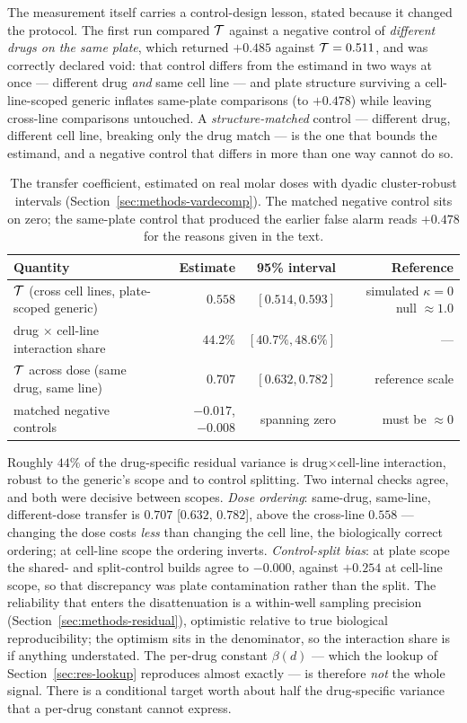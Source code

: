 The measurement itself carries a control-design lesson, stated because it changed the protocol.
The first run compared $\mathcal{T}$ against a negative control of \emph{different drugs on the same
plate}, which returned $+0.485$ against $\mathcal{T} = 0.511$, and was correctly declared void: that
control differs from the estimand in two ways at once --- different drug \emph{and} same cell line
--- and plate structure surviving a cell-line-scoped generic inflates same-plate comparisons (to
$+0.478$) while leaving cross-line comparisons untouched. A \emph{structure-matched} control ---
different drug, different cell line, breaking only the drug match --- is the one that bounds the
estimand, and a negative control that differs in more than one way cannot do so.

\begin{table}[h]
\centering
\begin{tabular}{lrrr}
\toprule
Quantity & Estimate & 95\% interval & Reference \\
\midrule
$\mathcal{T}$ (cross cell lines, plate-scoped generic) & $0.558$ & $[0.514, 0.593]$ & simulated $\kappa{=}0$ null $\approx 1.0$ \\
drug $\times$ cell-line interaction share & $44.2\%$ & $[40.7\%, 48.6\%]$ & --- \\
$\mathcal{T}$ across dose (same drug, same line) & $0.707$ & $[0.632, 0.782]$ & reference scale \\
matched negative controls & $-0.017$, $-0.008$ & spanning zero & must be $\approx 0$ \\
\bottomrule
\end{tabular}
\caption{The transfer coefficient, estimated on real molar doses with dyadic cluster-robust
intervals (Section~\ref{sec:methods-vardecomp}). The matched negative control sits on zero; the
same-plate control that produced the earlier false alarm reads $+0.478$ for the reasons given in
the text.}
\label{tab:transfer}
\end{table}

Roughly $44\%$ of the drug-specific residual variance is drug$\times$cell-line interaction, robust
to the generic's scope and to control splitting. Two internal checks agree, and both were decisive
between scopes. \emph{Dose ordering}: same-drug, same-line, different-dose transfer is $0.707$
[$0.632$, $0.782$], above the cross-line $0.558$ --- changing the dose costs \emph{less} than
changing the cell line, the biologically correct ordering; at cell-line scope the ordering
inverts. \emph{Control-split bias}: at plate scope the shared- and split-control builds agree to
$-0.000$, against $+0.254$ at cell-line scope, so that discrepancy was plate contamination rather
than the split. The reliability that enters the disattenuation is a within-well sampling precision
(Section~\ref{sec:methods-residual}), optimistic relative to true biological reproducibility; the
optimism sits in the denominator, so the interaction share is if anything understated. The per-drug
constant $\beta(d)$ --- which the lookup of Section~\ref{sec:res-lookup} reproduces almost exactly
--- is therefore \emph{not} the whole signal. There is a conditional target worth about half the
drug-specific variance that a per-drug constant cannot express.

